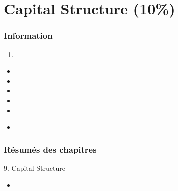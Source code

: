 \documentclass[12pt, titlepage, french]{report}
\begin{document}
\newpage

\chapter[Capital Structure]{Capital Structure (10\%)}

\subsection{Information}

\begin{distributions}[Objective]

\end{distributions}

\begin{outcomes}
\begin{enumerate}
	\item	
\end{enumerate}
\end{outcomes}

\begin{ASM_chapter}
\begin{itemize}
	\item	{}
	\item	{}
	\item	{}
	\item	{}
	\item	{}
\end{itemize}
\end{ASM_chapter}

\begin{YTB_vids}
\begin{itemize}
	\item	
\end{itemize}
\end{YTB_vids}

\subsection{Résumés des chapitres}

\begin{CHPT_SUMM_AUTO}[label = {L.-9}]{9. Capital Structure}
	\begin{itemize}
		\item	
	\end{itemize}
\end{CHPT_SUMM_AUTO}
\end{document}
